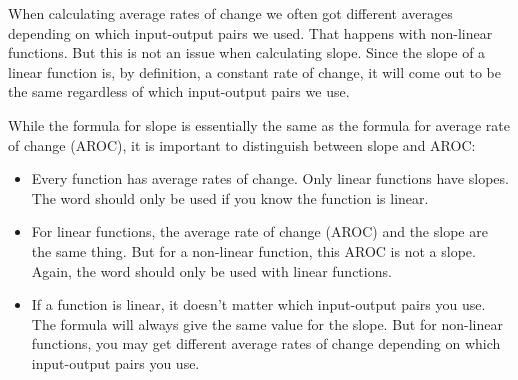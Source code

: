\bigskip

When calculating average rates of change we often got different averages depending on which input-output pairs we used. That happens with non-linear functions. But this is not an issue when calculating slope. Since the slope of a linear function is, by definition, a constant rate of change, it will come out to be the same regardless of which input-output pairs we use.



\bigskip

While the formula for slope is essentially the same as the formula for average rate of change (AROC), it is important to distinguish between slope and AROC:

\begin{itemize}
	\item Every function has average rates of change. Only linear functions have slopes. The word  should only be used if you know the function is linear.
	\item For linear functions, the average rate of change (AROC) and the slope are the same thing.  But for a non-linear function, this AROC is not a slope.  Again, the word  should only be used with linear functions.
	\item  If a function is linear, it doesn’t matter which input-output pairs you use. The formula will always give the same value for the slope. But for non-linear functions, you may get different average rates of change depending on which input-output pairs you use.
\end{itemize}

